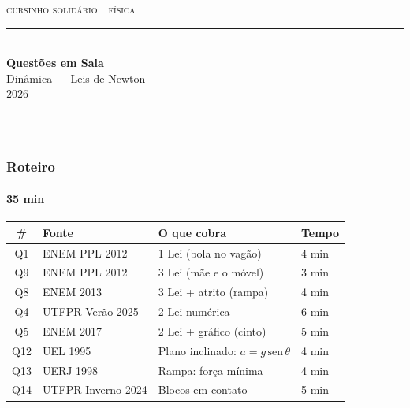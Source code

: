 \documentclass[aspectratio=169,12pt]{beamer}
\begin{document}

\begin{frame}[plain]
\vspace{0.6cm}
{\scshape\color{vinho}cursinho solid\'ario \,\textperiodcentered\, f\'isica}\\[-0.5em]
{\color{vinho}\rule{\textwidth}{1.6pt}}\\[1.0em]
{\huge\bfseries Quest\~oes em Sala}\\[0.45em]
{\LARGE Din\^amica --- Leis de Newton}\\[1.0em]
\hfill {\color{grafite}2026}\\[-0.3em]
{\color{black!30}\rule{\textwidth}{0.5pt}}\\[0.8em]
\end{frame}

\begin{frame}
\frametitle{Roteiro}
\framesubtitle{35 min}

\small
{\renewcommand{\arraystretch}{1.22}
\begin{tabular}{@{}clll@{}}
  \textbf{\#} & \textbf{Fonte} & \textbf{O que cobra} & \textbf{Tempo}\\[0.15em]
  \hline
  \rule{0pt}{1.15em}%
  Q1  & ENEM PPL 2012      & 1\textordfeminine{} Lei (bola no vag\~ao)      & 4 min \\
  Q9  & ENEM PPL 2012      & 3\textordfeminine{} Lei (m\~ae e o m\'ovel)    & 3 min \\
  Q8  & ENEM 2013          & 3\textordfeminine{} Lei + atrito (rampa)       & 4 min \\
  Q4  & UTFPR Ver\~ao 2025 & 2\textordfeminine{} Lei num\'erica             & 6 min \\
  Q5  & ENEM 2017          & 2\textordfeminine{} Lei + gr\'afico (cinto)    & 5 min \\
  Q12 & UEL 1995           & Plano inclinado: $a = g\,\mathrm{sen}\,\theta$ & 4 min \\
  Q13 & UERJ 1998          & Rampa: for\c{c}a m\'inima                      & 4 min \\
  Q14 & UTFPR Inverno 2024 & Blocos em contato                              & 5 min \\
\end{tabular}}

\end{frame}
\end{document}
